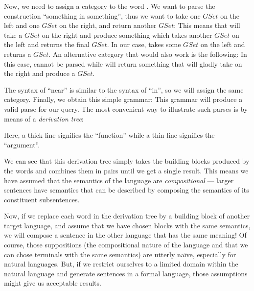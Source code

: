 \documentclass[main.tex]{subfiles}
\begin{document}
Now, we need to assign a category to the word . We want to parse
the construction ``something in something'', thus we want to take one $GSet$
on the left and one $GSet$ on the right, and return another $GSet$:
This means that  will take a $GSet$ on the right and produce something
which takes another $GSet$ on the left and returns the final $GSet$.
In our case,  takes some $GSet$ on the left and
returns a $GSet$.
An alternative category that would also work is the following:
In this case,  cannot be parsed while 
will return something that will gladly take  on the right and
produce a $GSet$.

The syntax of ``near'' is similar to the syntax of ``in'', so we will assign
the same category. Finally, we obtain this simple grammar:
This grammar will produce a valid parse for our query.
The most convenient way to illustrate such parses
is by means of a \emph{derivation tree}:

Here, a thick line signifies the ``function'' while a thin line signifies the
``argument''.

We can see that this derivation tree simply takes the building blocks produced
by the words and combines them in pairs until we get a single result. This means
we have assumed that the semantics of the language are \emph{compositional} ---
larger sentences have semantics that can be described by composing the semantics
of its constituent subsentences.

Now, if we replace each word in the derivation tree by a building block of another
target language, and assume that we have chosen blocks with the same semantics,
we will compose a sentence in the other language that has the same meaning!
Of course, those suppositions (the compositional nature of the language and
that we can chose terminals with the same semantics) are utterly naïve,
especially for natural languages. But, if we restrict ourselves to a limited
domain within the natural language and generate sentences in a formal language,
those assumptions might give us acceptable results.
\end{document}
